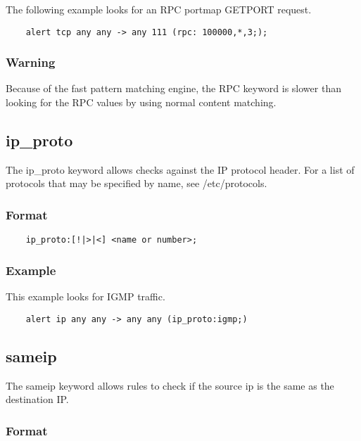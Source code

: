 \documentclass[english]{report}
\begin{document}
The following example looks for an RPC portmap GETPORT request.

\begin{verbatim}
    alert tcp any any -> any 111 (rpc: 100000,*,3;);
\end{verbatim}

\subsubsection{Warning}

Because of the fast pattern matching engine, the RPC keyword is slower than
looking for the RPC values by using normal content matching.

\subsection{ip\_proto}

The ip\_proto keyword allows checks against the IP protocol header.  For a list
of protocols that may be specified by name, see /etc/protocols. 

\subsubsection{Format}

\begin{verbatim}
    ip_proto:[!|>|<] <name or number>;
\end{verbatim}

\subsubsection{Example}

This example looks for IGMP traffic.

\begin{verbatim}
    alert ip any any -> any any (ip_proto:igmp;)
\end{verbatim}

\subsection{sameip}

The sameip keyword allows rules to check if the source ip is the same as the
destination IP.

\subsubsection{Format}
\end{document}

